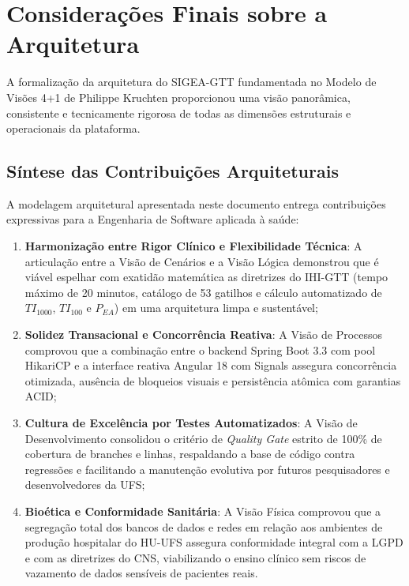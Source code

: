 \chapter{Considerações Finais sobre a Arquitetura}
\label{cap_consideracoes_finais_arq}

A formalização da arquitetura do SIGEA-GTT fundamentada no Modelo de Visões 4+1 de Philippe Kruchten proporcionou uma visão panorâmica, consistente e tecnicamente rigorosa de todas as dimensões estruturais e operacionais da plataforma.

\section{Síntese das Contribuições Arquiteturais}
\label{sec_sintese_contribuicoes}

A modelagem arquitetural apresentada neste documento entrega contribuições expressivas para a Engenharia de Software aplicada à saúde:

\begin{enumerate}
    \item \textbf{Harmonização entre Rigor Clínico e Flexibilidade Técnica}: A articulação entre a Visão de Cenários e a Visão Lógica demonstrou que é viável espelhar com exatidão matemática as diretrizes do IHI-GTT (tempo máximo de 20 minutos, catálogo de 53 gatilhos e cálculo automatizado de $TI_{1000}$, $TI_{100}$ e $P_{EA}$) em uma arquitetura limpa e sustentável;
    \item \textbf{Solidez Transacional e Concorrência Reativa}: A Visão de Processos comprovou que a combinação entre o backend Spring Boot 3.3 com pool HikariCP e a interface reativa Angular 18 com Signals assegura concorrência otimizada, ausência de bloqueios visuais e persistência atômica com garantias ACID;
    \item \textbf{Cultura de Excelência por Testes Automatizados}: A Visão de Desenvolvimento consolidou o critério de \textit{Quality Gate} estrito de 100\% de cobertura de branches e linhas, respaldando a base de código contra regressões e facilitando a manutenção evolutiva por futuros pesquisadores e desenvolvedores da UFS;
    \item \textbf{Bioética e Conformidade Sanitária}: A Visão Física comprovou que a segregação total dos bancos de dados e redes em relação aos ambientes de produção hospitalar do HU-UFS assegura conformidade integral com a LGPD e com as diretrizes do CNS, viabilizando o ensino clínico sem riscos de vazamento de dados sensíveis de pacientes reais.
\end{enumerate}

